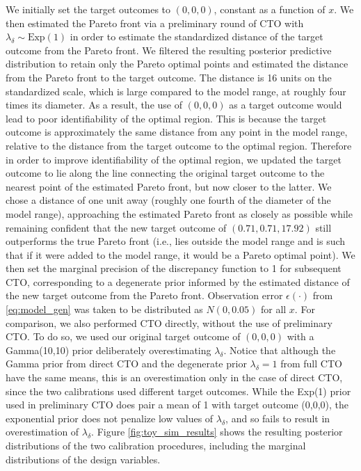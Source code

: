 \documentclass[12pt]{article}
\begin{document}
We initially set the target outcomes to $(0,0,0)$, constant as a function of $x$. 
%
We then estimated the Pareto front via a preliminary round of CTO with $\lambda_\delta\sim \mathrm{Exp}(1)$ in order to estimate the standardized distance of the target outcome from the Pareto front.
%
We filtered the resulting posterior predictive distribution to retain only the Pareto optimal points and estimated the distance from the Pareto front to the target outcome.
%
The distance is 16 units on the standardized scale, which is large compared to the model range, at roughly four times its diameter.
%
As a result, the use of $(0,0,0)$ as a target outcome would lead to poor identifiability of the optimal region. 
%
This is because the target outcome is approximately the same distance from any point in the model range, relative to the distance from the target outcome to the optimal region.
%
Therefore in order to improve identifiability of the optimal region, we updated the target outcome to lie along the line connecting the original target outcome to the nearest point of the estimated Pareto front, but now closer to the latter.
%
We chose a distance of one unit away (roughly one fourth of the diameter of the model range), approaching the estimated Pareto front as closely as possible while remaining confident that the new target outcome of $(0.71, 0.71, 17.92)$ still outperforms the true Pareto front (i.e., lies outside the model range and is such that if it were added to the model range, it would be a Pareto optimal point).
%
We then set the marginal precision of the discrepancy function to 1 for subsequent CTO, corresponding to a degenerate prior informed by the estimated distance of the new target outcome from the Pareto front.
%
Observation error $\epsilon(\cdot)$ from \eqref{eq:model_gen} was taken to be distributed as $N(0,0.05)$ for all $x$.
%
For comparison, we also performed CTO directly, without the use of preliminary CTO.
%
To do so, we used our original target outcome of $(0,0,0)$ with a Gamma(10,10) prior deliberately overestimating $\lambda_\delta$.
%
Notice that although the Gamma prior from direct CTO and the degenerate prior $\lambda_\delta=1$ from full CTO have the same means, this is an overestimation only in the case of direct CTO, since the two calibrations used different target outcomes.
%
While the Exp(1) prior used in preliminary CTO does pair a mean of 1 with target outcome (0,0,0), the exponential prior does not penalize low values of $\lambda_\delta$, and so fails to result in overestimation of $\lambda_\delta$.
%
Figure \ref{fig:toy_sim_results} shows the resulting posterior distributions of the two calibration procedures, including the marginal distributions of the design variables. 
\end{document}
